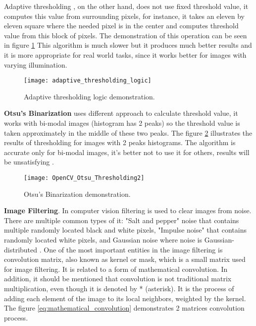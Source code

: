 \documentclass[../../../../main]{subfiles}
\begin{document}
\newpage

Adaptive thresholding \cite{learning_opencv}, on the other hand, does not use fixed threshold value, it computes this value from surrounding pixels, for instance, it takes an eleven by eleven square where the needed pixel is in the center and computes threshold value from this block of pixels. The demonstration of this operation can be seen in figure \ref{fig:adaptiveThresholdingLogic} This algorithm is much slower but it produces much better results and it is more appropriate for real world tasks, since it works better for images with varying illumination.

\begin{figure} [!ht]
    \begin{center}
        \texttt{[image: adaptive\_thresholding\_logic]}
        \caption{Adaptive thresholding logic demonstration.}
        \label{fig:adaptiveThresholdingLogic}
    \end{center}
\end{figure}

\textbf{Otsu's Binarization} uses different approach to calculate threshold value, it works with bi-modal images (histogram has 2 peaks) so the threshold value is taken approximately in the middle of these two peaks. The figure \ref{fig:otsuThresholding} illustrates the results of thresholding for images with 2 peaks histograms. The algorithm is accurate only for bi-modal images, it's better not to use it for others, results will be unsatisfying \cite{opencv_docs_thresholding}.

\begin{figure} [!ht]
\begin{center}
\texttt{[image: OpenCV\_Otsu\_Thresholding2]}
\caption{Otsu's Binarization demonstration.}
\label{fig:otsuThresholding}
\end{center}
\end{figure}

\newpage

\textbf{Image Filtering}. In computer vision filtering is used to clear images from noise. There are multiple common types of it: "Salt and pepper" noise that contains multiple randomly located black and white pixels, "Impulse noise" that contains randomly located white pixels, and Gaussian noise where noise is Gaussian-distributed \cite{opencv_docs_image_smoothing}.
One of the most important entities in the image filtering is convolution matrix, also known as kernel or mask, which is a small matrix used for image filtering. It is related to a form of mathematical convolution. In addition, it should be mentioned that convolution is not traditional matrix multiplication, even though it is denoted by * (asterisk). It is the process of adding each element of the image to its local neighbors, weighted by the kernel. The figure \ref{eq:mathematical_convolution} demonstrates 2 matrices convolution process.
\end{document}
